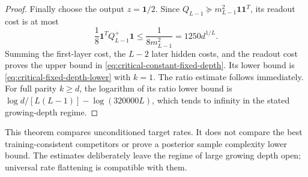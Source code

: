 \begin{proof}
Finally choose the output $z=\mathbf1/2$. Since
$Q_{L-1}\succeq m_{L-1}^2\mathbf1\mathbf1^T$, its readout cost is at most
\[
 \frac18\mathbf1^TQ_{L-1}^+\mathbf1
 \le\frac1{8m_{L-1}^2}=1250d^{1/L}.
\]
Summing the first-layer cost, the $L-2$ later hidden costs, and the
readout cost proves the upper bound in
\eqref{eq:critical-constant-fixed-depth}. Its lower bound is
\eqref{eq:critical-fixed-depth-lower} with $k=1$. The ratio estimate
follows immediately. For full parity $k\ge d$, the logarithm of its
ratio lower bound is
$\log d/[L(L-1)]-\log(320000L)$, which tends to infinity in the
stated growing-depth regime.
\end{proof}

This theorem compares unconditioned target rates. It does not compare
the best training-consistent competitors or prove a posterior sample
complexity lower bound. The estimates deliberately leave the regime
of large growing depth open; universal rate flattening is compatible
with them.
